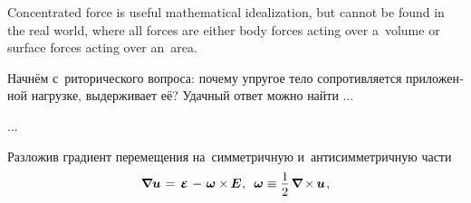 \begin{otherlanguage}{russian}

{\small
Concentrated force is useful mathematical idealization, but cannot be found in the real world, where all forces are either body forces acting over a~volume or surface forces acting over an~area.
\par}

Начнём с~риторического вопроса: почему упругое тело сопротивляется приложенной нагрузке, выдерживает её? Удачный ответ можно найти ...

...







\label{para:displacementsfromdeformations}

Разложив градиент перемещения на~симметричную и~антисимметричную части
\nopagebreak\vspace{.1em}\begin{equation}
\boldnabla \bm{u} \hspace{.2ex} = \tikzmark{beginSymmNablaU} \hspace{0.32ex} \mathboldepsilon \hspace{0.4ex} \tikzmark{endSymmNablaU} \hspace{-0.16ex} - \hspace{.25ex} \tikzmark{beginAsymmNablaU} \bm{\omega} \times \hspace{-0.12ex} \bm{E} \tikzmark{endAsymmNablaU} \hspace{.1ex} , \:\;
\bm{\omega} \equiv \displaystyle \onehalf \hspace{.32ex} \boldnabla \hspace{-0.12ex} \times \hspace{-0.12ex} \bm{u} \hspace{.2ex},
\end{equation}%
%


\end{otherlanguage}
